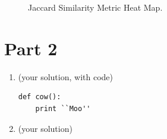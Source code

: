 \documentclass[12pt]{article}
\begin{document}
\begin{enumerate}[label=(\alph*)]
\begin{figure}[!ht]
      \begin{caption}
        Jaccard Similarity Metric Heat Map.
      \end{caption}
    \end{figure}
\end{enumerate}

\section*{Part 2}

\begin{enumerate}[label=(\alph*)]
  \item (your solution, with code)
\begin{verbatim}
def cow():
    print ``Moo''
\end{verbatim}

  \item (your solution)
\end{enumerate}
\end{document}

